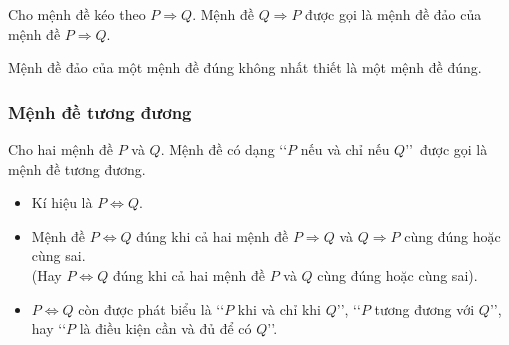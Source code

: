 \begin{tomtat}
	

\begin{boxdn}{}
	Cho mệnh đề kéo theo $P\Rightarrow Q$. Mệnh đề $Q\Rightarrow P$ được gọi là mệnh đề đảo của mệnh đề $P\Rightarrow Q$.
\end{boxdn}

\begin{note}
	Mệnh đề đảo của một mệnh đề đúng không nhất thiết là một mệnh đề đúng.
\end{note}

\subsubsection{Mệnh đề tương đương}

\begin{boxdn}{}
	Cho hai mệnh đề $P$ và $Q$. Mệnh đề có dạng \lq\lq  $P$ nếu và chỉ nếu $Q$\rq\rq\ được gọi là mệnh đề tương đương.
	\begin{itemize}
		\item Kí hiệu là $P \Leftrightarrow Q$.
		\item Mệnh đề $P \Leftrightarrow Q$ đúng khi cả hai mệnh đề $P\Rightarrow Q$ và $Q \Rightarrow P$ cùng đúng hoặc cùng sai. \\
		(Hay $P \Leftrightarrow Q$ đúng khi cả hai mệnh đề $P$ và $Q$ cùng đúng hoặc cùng sai).
		\item $P\Leftrightarrow Q$ còn được phát biểu là \lq\lq  $P$ khi và chỉ khi $Q$\rq\rq, \lq\lq  $P$ tương đương với $Q$\rq\rq, hay \lq\lq  $P$ là điều kiện cần và đủ để có $Q$\rq\rq.
	\end{itemize}
\end{boxdn}



\end{tomtat}
